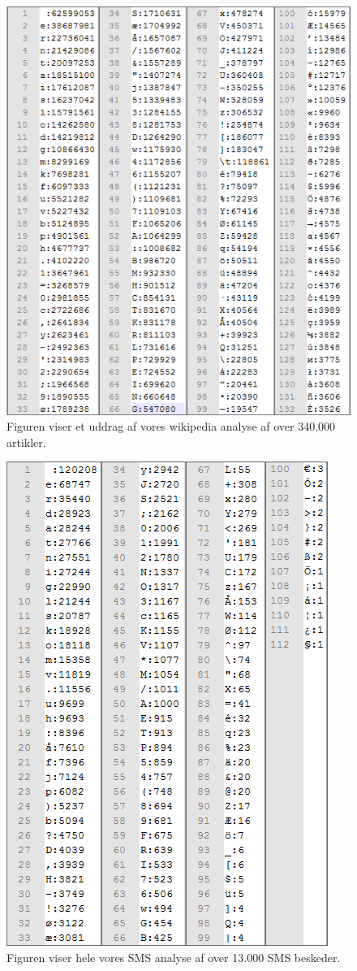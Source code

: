 \begin{figure}[H]
\includegraphics []{Billeder/wikiBilag.png}
\caption {Figuren viser et uddrag af vores wikipedia analyse af over 340.000 artikler.}
\label {wikiAnalyse}
\end{figure}

\begin{figure}[H]
\includegraphics []{Billeder/SMSbilag.png}
\caption {Figuren viser hele vores SMS analyse af over 13.000 SMS beskeder.}
\label {SMSanalyse}
\end{figure}

